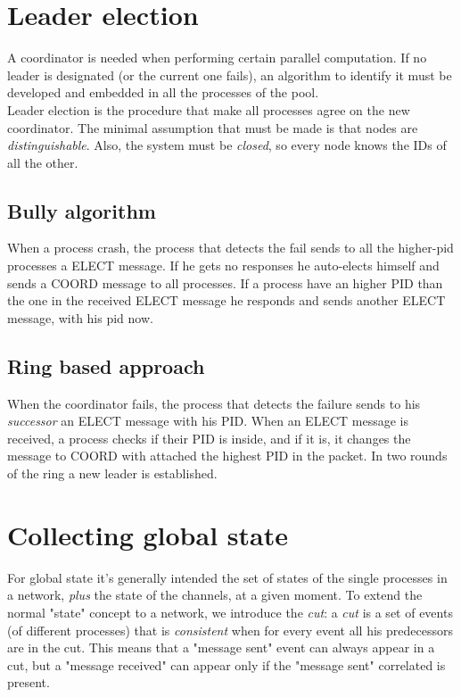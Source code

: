 \documentclass[10pt,a4paper]{article}
\begin{document}
		\section{Leader election}
			A coordinator is needed when performing certain parallel computation. If no leader is designated (or the current one fails), an algorithm to identify it must be developed and embedded in all the processes of the pool.\\
			Leader election is the procedure that make all processes agree on the new coordinator. The minimal assumption that must be made is that nodes are \emph{distinguishable}. Also, the system must be \emph{closed}, so every node knows the IDs of all the other.
			
			\subsection{Bully algorithm}
				When a process crash, the process that detects the fail sends to all the higher-pid processes a ELECT message. If he gets no responses he auto-elects himself and sends a COORD message to all processes. If a process have an higher PID than the one in the received ELECT message he responds and sends another ELECT message, with his pid now.
				
			\subsection{Ring based approach}
				When the coordinator fails, the process that detects the failure sends to his \emph{successor} an ELECT message with his PID. When an ELECT message is received, a process checks if their PID is inside, and if it is, it changes the message to COORD with attached the highest PID in the packet. In two rounds of the ring a new leader is established.
		
		\section{Collecting global state}
			For global state it's generally intended the set of states of the single processes in a network, \emph{plus} the state of the channels, at a given moment. To extend the normal "state" concept to a network, we introduce the \emph{cut}: a \emph{cut} is a set of events (of different processes) that is \emph{consistent} when for every event all his predecessors are in the cut. This means that a "message sent" event can always appear in a cut, but a "message received" can appear only if the "message sent" correlated is present.
			
\end{document}
